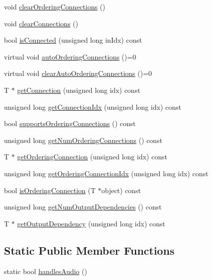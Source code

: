 \begin{DoxyCompactItemize}
\item 
void \hyperlink{class_frame_lib___object_abd548d2e3899a1a8738a71b3824ac039}{clear\+Ordering\+Connections} ()
\item 
void \hyperlink{class_frame_lib___object_a4fa6add369fd21ddc5250efd740d0285}{clear\+Connections} ()
\item 
bool \hyperlink{class_frame_lib___object_a2b4ed60a6032ff9fab191fcb492ef404}{is\+Connected} (unsigned long in\+Idx) const
\item 
virtual void \hyperlink{class_frame_lib___object_afa5bb93302a641c23b5eac7ab0dfe516}{auto\+Ordering\+Connections} ()=0
\item 
virtual void \hyperlink{class_frame_lib___object_aac43ebfacb59081f7f60957380df7481}{clear\+Auto\+Ordering\+Connections} ()=0
\item 
T $\ast$ \hyperlink{class_frame_lib___object_ad660fd98d11c9a91bf9131f35ba365a6}{get\+Connection} (unsigned long idx) const
\item 
unsigned long \hyperlink{class_frame_lib___object_a40383ebb4672e2bb1bd7ad41da14e967}{get\+Connection\+Idx} (unsigned long idx) const
\item 
bool \hyperlink{class_frame_lib___object_a0f0baead3c4ca259a6b4e7a417f45735}{supports\+Ordering\+Connections} () const
\item 
unsigned long \hyperlink{class_frame_lib___object_ace330616fd3334122babc5901b758d28}{get\+Num\+Ordering\+Connections} () const
\item 
T $\ast$ \hyperlink{class_frame_lib___object_a6a368084d4df3cfe02487d47e436a125}{get\+Ordering\+Connection} (unsigned long idx) const
\item 
unsigned long \hyperlink{class_frame_lib___object_a06858c0d70dfd61e03442fc17e224d5c}{get\+Ordering\+Connection\+Idx} (unsigned long idx) const
\item 
bool \hyperlink{class_frame_lib___object_a4a4ce727ae1b9e9bb11162a9bf99e601}{is\+Ordering\+Connection} (T $\ast$object) const
\item 
unsigned long \hyperlink{class_frame_lib___object_a80ca53cc96b35c672b82d175840da496}{get\+Num\+Output\+Dependencies} () const
\item 
T $\ast$ \hyperlink{class_frame_lib___object_a3a1f27bd291ff08dbb9324815078ca85}{get\+Output\+Dependency} (unsigned long idx) const
\end{DoxyCompactItemize}
\subsection*{Static Public Member Functions}
\begin{DoxyCompactItemize}
\item 
static bool \hyperlink{class_frame_lib___object_a3d8517596d7598585c08af375dae79b9}{handles\+Audio} ()
\end{DoxyCompactItemize}
